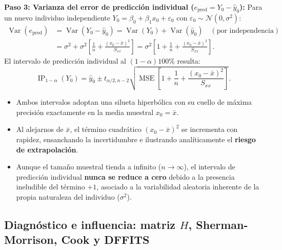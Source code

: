 \documentclass[11pt,a4paper]{article}
\begin{document}
\begin{demobox}
\textbf{Paso 3: Varianza del error de predicción individual ($e_{\text{pred}} = Y_0 - \hat{y}_0$):}  
Para un nuevo individuo independiente $Y_0 = \beta_0 + \beta_1 x_0 + \varepsilon_0$ con $\varepsilon_0 \sim \mathcal{N}(0, \sigma^2)$:
\begin{align}
\operatorname{Var}(e_{\text{pred}}) &= \operatorname{Var}(Y_0 - \hat{y}_0) = \operatorname{Var}(Y_0) + \operatorname{Var}(\hat{y}_0) \quad (\text{por independencia}) \\
&= \sigma^2 + \sigma^2 \left[\frac{1}{n} + \frac{(x_0 - \bar{x})^2}{S_{xx}}\right] = \sigma^2 \left[ 1 + \frac{1}{n} + \frac{(x_0 - \bar{x})^2}{S_{xx}} \right].
\end{align}
El intervalo de predicción individual al $(1-\alpha)100\%$ resulta:
\begin{equation}
\operatorname{IP}_{1-\alpha}(Y_0) = \hat{y}_0 \pm t_{\alpha/2, n-2} \sqrt{\operatorname{MSE}\left[ 1 + \frac{1}{n} + \frac{(x_0 - \bar{x})^2}{S_{xx}} \right]}.
\end{equation}
\end{demobox}

\begin{intuicionbox}
\begin{itemize}
    \item Ambos intervalos adoptan una silueta hiperbólica con su cuello de máxima precisión exactamente en la media muestral $x_0 = \bar{x}$.
    \item Al alejarnos de $\bar{x}$, el término cuadrático $(x_0 - \bar{x})^2$ se incrementa con rapidez, ensanchando la incertidumbre e ilustrando analíticamente el \textbf{riesgo de extrapolación}.
    \item Aunque el tamaño muestral tienda a infinito ($n \to \infty$), el intervalo de predicción individual \textbf{nunca se reduce a cero} debido a la presencia ineludible del término $+1$, asociado a la variabilidad aleatoria inherente de la propia naturaleza del individuo ($\sigma^2$).
\end{itemize}
\end{intuicionbox}



\subsection{Diagnóstico e influencia: matriz $H$, Sherman-Morrison, Cook y DFFITS}
\end{document}

